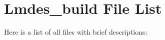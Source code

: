 \section{Lmdes\_\-build File List}
Here is a list of all files with brief descriptions:\begin{CompactList}
\item{}
\end{CompactList}
